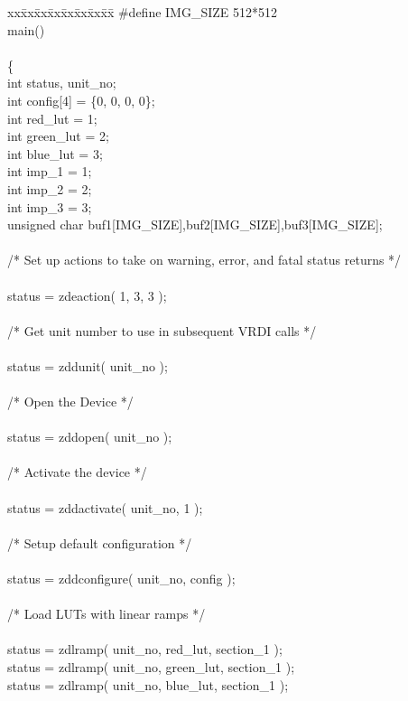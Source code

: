 \begin{tabbing}
xx\=xx\=xx\=xx\=xx\=xx\=xx\=xx\=\kill
\#define IMG\_SIZE 512*512\\
main()\\
\\
\{\\
\>int status, unit\_no;\\
\>int config[4] = \{0, 0, 0, 0\};\\
\>int red\_lut = 1;\\
\>int green\_lut = 2;\\
\>int blue\_lut = 3;\\
\>int imp\_1 = 1;\\
\>int imp\_2 = 2;\\
\>int imp\_3 = 3;\\
\>unsigned char buf1[IMG\_SIZE],buf2[IMG\_SIZE],buf3[IMG\_SIZE];\\
\\
/*  Set up actions to take on warning, error, and fatal status returns */\\
\\
\>status = zdeaction( 1, 3, 3 );\\
\\
/*  Get unit number to use in subsequent VRDI calls */\\
\\
\>status = zddunit( unit\_no );\\
\\
/*  Open the Device */\\
\\
\>status = zddopen( unit\_no );\\
\\
/*  Activate the device */\\
\\
\>status = zddactivate( unit\_no, 1 );\\
\\
/*  Setup default configuration */\\
\\
\>status = zddconfigure( unit\_no, config );\\
\\
/*  Load LUTs with linear ramps */\\
\\
\>status = zdlramp( unit\_no, red\_lut, section\_1 );\\
\>status = zdlramp( unit\_no, green\_lut, section\_1 );\\
\>status = zdlramp( unit\_no, blue\_lut, section\_1 );\\

\end{tabbing}
